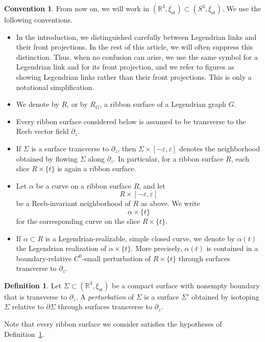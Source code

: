 \documentclass{amsart}
\numberwithin{equation}{section}
\numberwithin{figure}{section}
\theoremstyle{definition}
\newtheorem{definition}[theorem]{Definition}
\newtheorem{convention}[theorem]{Convention}
\theoremstyle{remark}
\newcommand{\R}{\mathbb{R}}
\let\oldSigma\Sigma
\renewcommand{\Sigma}{\oldSigma}
\let\oldalpha\alpha %
\renewcommand{\alpha}{\oldalpha}
\let\olddxi\xi %
\renewcommand{\xi}{\olddxi}
\newcommand{\xist}{\olddxi_{\mathrm{st}}}
\newcommand{\G}{G}
\begin{document}
\begin{convention}
From now on, we will work in $(\R^3,\xist)\subset(S^3,\xist)$. We use the following conventions.
\begin{itemize}
    \item In the introduction, we distinguished carefully between Legendrian links and their front projections. In the rest of this article, we will often suppress this distinction. Thus, when no confusion can arise, we use the same symbol for a Legendrian link and for its front projection, and we refer to figures as showing Legendrian links rather than their front projections. This is only a notational simplification.
    \item We denote by \(R\), or by \(R_{\G}\), a ribbon surface of a Legendrian graph \(\G\).
    \item Every ribbon surface considered below is assumed to be transverse to the Reeb vector field \(\partial_z\).
    \item If \(\Sigma\) is a surface transverse to \(\partial_z\), then
$\Sigma\times[-\varepsilon,\varepsilon]$
    denotes the neighborhood obtained by flowing \(\Sigma\) along \(\partial_z\). In particular, for a ribbon surface \(R\), each slice \(R\times\{t\}\) is again a ribbon surface.
    \item Let \(\alpha\) be a curve on a ribbon surface \(R\), and let
    \[
    R\times[-\varepsilon,\varepsilon]
    \]
    be a Reeb-invariant neighborhood of \(R\) as above. We write
    \[
    \alpha\times\{t\}
    \]
    for the corresponding curve on the slice \(R\times\{t\}\).
    \item If \(\alpha\subset R\) is a Legendrian-realizable, simple closed curve, we denote by \(\alpha(t)\) the Legendrian realization of \(\alpha\times\{t\}\). More precisely, \(\alpha(t)\) is contained in a boundary-relative \(C^0\)-small perturbation of \(R\times\{t\}\) through surfaces transverse to \(\partial_z\).
\end{itemize}
\end{convention}

\begin{definition}\label{def:perturbation}
  Let $\Sigma\subset(\R^3,\xist)$ be a compact surface with nonempty boundary that is transverse to $\partial_z$. A \emph{perturbation} of $\Sigma$ is a surface $\Sigma'$ obtained by isotoping $\Sigma$ relative to $\partial\Sigma$ through surfaces transverse to $\partial_z$.
\end{definition}

Note that every ribbon surface we consider satisfies the hypotheses of Definition~\ref{def:perturbation}.
\end{document}
